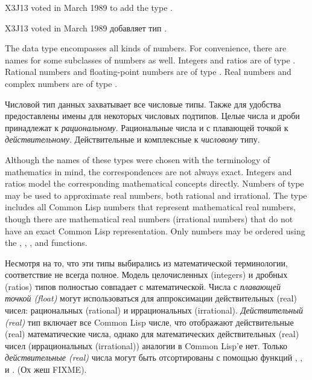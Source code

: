 \begin{newer}
X3J13 voted in March 1989  to add the type .

X3J13 voted in March 1989  добавляет тип .

The  data type encompasses all kinds of
             numbers.  For convenience, there are names for some
             subclasses of numbers as well.  Integers and ratios are of
             type .  Rational numbers and floating-point
             numbers are of type .  Real numbers and complex
             numbers are of type .

Числовой тип данных захватывает все числовые типы. Также для
удобства предоставлены имены для некоторых числовых
подтипов. Целые числа и дроби принадлежат к
\emph{рациональному}. Рациональные числа и с плавающей точкой к
\emph{действительному}. Действительные и комплексные к \emph{числовому} типу.

             Although the names of these types were chosen with the
             terminology of mathematics in mind, the correspondences
             are not always exact.  Integers and ratios model the
             corresponding mathematical concepts directly.  Numbers
             of type  may be used to approximate real
             numbers, both rational and irrational.  The  type
             includes all Common Lisp numbers that represent
             mathematical real numbers, though there are
             mathematical real numbers (irrational numbers)
             that do not have an exact Common Lisp representation.
             Only  numbers may be ordered using the \cd{<}, \cd{>}, \cd{<=},
             and \cd{>=} functions.

Несмотря на то, что эти типы выбирались из математической
терминологии, соответствие не всегда полное. Модель целочисленных
(integers) и дробных (ratios) типов полностью совпадает с
математической. Числа с \emph{плавающей точкой (float)} могут
использоваться для аппроксимации действительных (real) чисел:
рациональных (rational) и иррациональных
(irrational). \emph{Действительный (real)} тип включает все Common Lisp
числе, что отображают действительные (real) математические числа,
однако для математических действительных (real) чисел
(иррациональных (irrational)) аналогии в Cоmmon Lisp'е нет. Только
\emph{действительные (real)} числа могут быть отсортированы с помощью
функций \cd{<}, \cd{>}, \cd{<=} и \cd{>=}. (Ох жеш FIXME). 


\end{newer}

